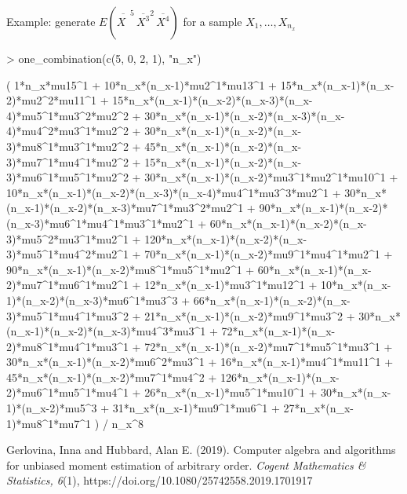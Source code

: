 \documentclass[12pt]{article}
\begin{document}
Example: generate $E\left(\overline{X^{\phantom{1}}}^5 \, \overline{X^3}^2 \, \overline{X^4}\right)$ for a sample $X_1, \dotsc, X_{n_x}$
\begin{Schunk}
\begin{Sinput}
> one_combination(c(5, 0, 2, 1), "n_x")
\end{Sinput}
\end{Schunk}
\begin{Schunk}
\begin{Soutput}
( 1*n_x*mu15^1 + 10*n_x*(n_x-1)*mu2^1*mu13^1 +
15*n_x*(n_x-1)*(n_x-2)*mu2^2*mu11^1 +
15*n_x*(n_x-1)*(n_x-2)*(n_x-3)*(n_x-4)*mu5^1*mu3^2*mu2^2 +
30*n_x*(n_x-1)*(n_x-2)*(n_x-3)*(n_x-4)*mu4^2*mu3^1*mu2^2 +
30*n_x*(n_x-1)*(n_x-2)*(n_x-3)*mu8^1*mu3^1*mu2^2 +
45*n_x*(n_x-1)*(n_x-2)*(n_x-3)*mu7^1*mu4^1*mu2^2 +
15*n_x*(n_x-1)*(n_x-2)*(n_x-3)*mu6^1*mu5^1*mu2^2 +
30*n_x*(n_x-1)*(n_x-2)*mu3^1*mu2^1*mu10^1 +
10*n_x*(n_x-1)*(n_x-2)*(n_x-3)*(n_x-4)*mu4^1*mu3^3*mu2^1 +
30*n_x*(n_x-1)*(n_x-2)*(n_x-3)*mu7^1*mu3^2*mu2^1 +
90*n_x*(n_x-1)*(n_x-2)*(n_x-3)*mu6^1*mu4^1*mu3^1*mu2^1 +
60*n_x*(n_x-1)*(n_x-2)*(n_x-3)*mu5^2*mu3^1*mu2^1 +
120*n_x*(n_x-1)*(n_x-2)*(n_x-3)*mu5^1*mu4^2*mu2^1 +
70*n_x*(n_x-1)*(n_x-2)*mu9^1*mu4^1*mu2^1 +
90*n_x*(n_x-1)*(n_x-2)*mu8^1*mu5^1*mu2^1 +
60*n_x*(n_x-1)*(n_x-2)*mu7^1*mu6^1*mu2^1 + 12*n_x*(n_x-1)*mu3^1*mu12^1
+ 10*n_x*(n_x-1)*(n_x-2)*(n_x-3)*mu6^1*mu3^3 +
66*n_x*(n_x-1)*(n_x-2)*(n_x-3)*mu5^1*mu4^1*mu3^2 +
21*n_x*(n_x-1)*(n_x-2)*mu9^1*mu3^2 +
30*n_x*(n_x-1)*(n_x-2)*(n_x-3)*mu4^3*mu3^1 +
72*n_x*(n_x-1)*(n_x-2)*mu8^1*mu4^1*mu3^1 +
72*n_x*(n_x-1)*(n_x-2)*mu7^1*mu5^1*mu3^1 +
30*n_x*(n_x-1)*(n_x-2)*mu6^2*mu3^1 + 16*n_x*(n_x-1)*mu4^1*mu11^1 +
45*n_x*(n_x-1)*(n_x-2)*mu7^1*mu4^2 +
126*n_x*(n_x-1)*(n_x-2)*mu6^1*mu5^1*mu4^1 + 26*n_x*(n_x-1)*mu5^1*mu10^1
+ 30*n_x*(n_x-1)*(n_x-2)*mu5^3 + 31*n_x*(n_x-1)*mu9^1*mu6^1 +
27*n_x*(n_x-1)*mu8^1*mu7^1 ) / n_x^8
\end{Soutput}
\end{Schunk}

\begin{thebibliography}{}
  Gerlovina, Inna and Hubbard, Alan E. (2019).
  Computer algebra and algorithms for unbiased moment estimation of arbitrary order.
  \textit{Cogent Mathematics \& Statistics, 6}(1), https://doi.org/10.1080/25742558.2019.1701917
\end{thebibliography}
\end{document}
